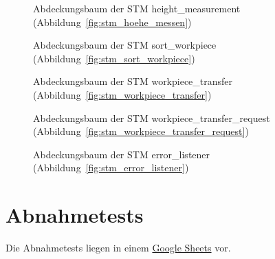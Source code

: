 \begin{figure}
    \caption{Abdeckungsbaum der STM height\_measurement
        (Abbildung~\ref{fig:stm_hoehe_messen})}
    \label{fig:tt_height_measurement}
\end{figure}

\begin{figure}
    \caption{Abdeckungsbaum der STM sort\_workpiece
        (Abbildung~\ref{fig:stm_sort_workpiece})}
    \label{fig:tt_sort_workpiece}
\end{figure}

\begin{figure}
    \caption{Abdeckungsbaum der STM workpiece\_transfer
        (Abbildung~\ref{fig:stm_workpiece_transfer})}
    \label{fig:tt_workpiece_transfer}
\end{figure}

\begin{figure}
    \caption{Abdeckungsbaum der STM workpiece\_transfer\_request
        (Abbildung~\ref{fig:stm_workpiece_transfer_request})}
    \label{fig:tt_workpiece_transfer_request}
\end{figure}

\begin{figure}
    \caption{Abdeckungsbaum der STM error\_listener
        (Abbildung~\ref{fig:stm_error_listener})}
    \label{fig:tt_error_listener}
\end{figure}


\FloatBarrier
\section{Abnahmetests}\label{sec:abnahmetest}

%
Die Abnahmetests liegen in einem
\href{https://docs.google.com/spreadsheets/d/1FzOZ4AyaUKZ6hcOzm9CIS6r-4n3aabzFG-6NZyX3wJg/edit?usp=sharing}{Google Sheets}
vor.


